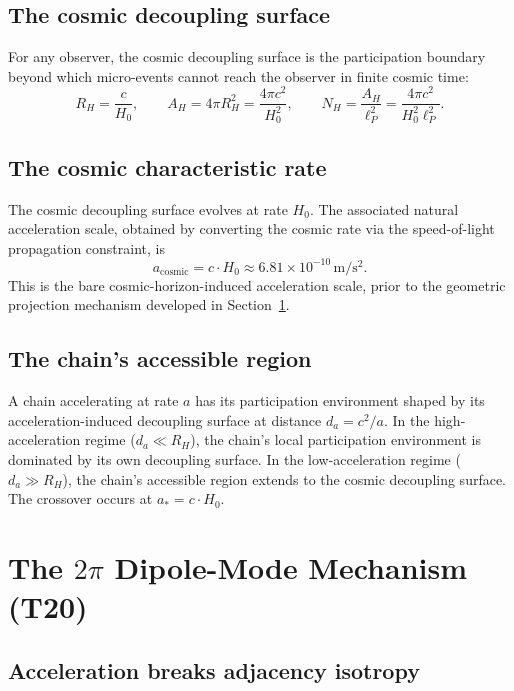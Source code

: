 \documentclass[11pt,a4paper]{article}
\begin{document}
\subsection{The cosmic decoupling surface}

For any observer, the cosmic decoupling surface is the participation boundary beyond which micro-events cannot reach the observer in finite cosmic time:
\begin{equation}
R_H = \frac{c}{H_0}, \qquad A_H = 4\pi R_H^2 = \frac{4\pi c^2}{H_0^2}, \qquad N_H = \frac{A_H}{\ell_P^2} = \frac{4\pi c^2}{H_0^2 \ell_P^2}.
\end{equation}

\subsection{The cosmic characteristic rate}

The cosmic decoupling surface evolves at rate $H_0$. The associated natural acceleration scale, obtained by converting the cosmic rate via the speed-of-light propagation constraint, is
\begin{equation}
a_{\mathrm{cosmic}} = c \cdot H_0 \approx 6.81 \times 10^{-10}\,\mathrm{m/s^2}.
\end{equation}
This is the bare cosmic-horizon-induced acceleration scale, prior to the geometric projection mechanism developed in Section~\ref{sec:dipole}.

\subsection{The chain's accessible region}

A chain accelerating at rate $a$ has its participation environment shaped by its acceleration-induced decoupling surface at distance $d_a = c^2/a$. In the high-acceleration regime ($d_a \ll R_H$), the chain's local participation environment is dominated by its own decoupling surface. In the low-acceleration regime ($d_a \gg R_H$), the chain's accessible region extends to the cosmic decoupling surface. The crossover occurs at $a_* = c \cdot H_0$.

\section{The $2\pi$ Dipole-Mode Mechanism (T20)}\label{sec:dipole}

\subsection{Acceleration breaks adjacency isotropy}
\end{document}
